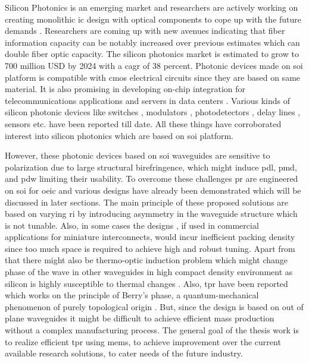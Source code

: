 \documentclass[../report.tex]{subfiles}
\begin{document}
Silicon Photonics is an emerging market and researchers are actively working on creating monolithic \gls{ic} design with optical components to cope up with the future demands \cite{optical_linking}. Researchers are coming up with new avenues indicating that fiber information capacity can be notably increased over previous estimates \cite{temprana_overcoming_2015} which can double fiber optic capacity. The silicon photonics market is estimated to grow to 700 million USD by 2024 \cite{silicon_photonics_growth_2015} with a \gls{cagr} of 38 percent. Photonic devices made on \gls{soi} platform is compatible with \gls{cmos} electrical circuits since they are based on same material. It is also promising in developing on-chip integration for telecommunications applications and servers in data centers \cite{jalali_silicon_2006}. Various kinds of silicon photonic devices like switches \cite{wu_mems-enabled_2015,nikolova_scaling_2015,lu_low-power_2014}, modulators \cite{dong_silicon_2015,chen_generation_2013}, photodetectors \cite{urino_demonstration_2012,chang_high-power_2015}, delay lines \cite{garcia_design_2015,mattarei_variable_2014}, sensors \cite{janz_silicon_2007,lim_laser_2010,ryckeboer_glucose_2014} etc. have been reported till date. All these things have corroborated interest into silicon photonics which are based on \gls{soi} platform.\par   

However, these photonic devices based on \gls{soi} waveguides are sensitive to polarization due to large structural birefringence, which might induce \gls{pdl}, \gls{pmd}, and \gls{pdw} limiting their usability. To overcome these challenges \gls{pr} are engineered on \gls{soi} for \gls{oeic} and various designs have already been demonstrated \cite{xie_efficient_2015,velasco_ultracompact_2012,leung_numerical_2011,wang_design_2014,dai_novel_2011,wirth_efficient_2012,chen_compact_2011} which will be discussed in later sections. The main principle of these proposed solutions are based on varying \gls{ri} by introducing asymmetry in the waveguide structure which is not tunable. Also, in some cases the designs \cite{sarmiento-merenguel_demonstration_2015}, if used in commercial applications for miniature interconnects, would incur inefficient packing density since too much space is required to achieve high and robust tuning. Apart from that there might also be thermo-optic induction problem which might change phase of the wave in other waveguides in high compact density environment as silicon is highly susceptible to thermal changes \cite{ibrahim_athermal_2012}. Also, \gls{tpr} have been reported which works on the principle of Berry’s phase, a quantum-mechanical phenomenon of purely topological origin \cite{xu_electrically_2014}. But, since the design is based on out of plane waveguides it might be difficult to achieve efficient mass production without a complex manufacturing process. The general goal of the thesis work is to realize efficient \gls{tpr} using \gls{mems}, to achieve improvement over the current available research solutions, to cater needs of the future industry.    
\end{document}
